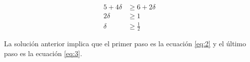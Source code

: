 \documentclass[12pt]{article}
\begin{document}
 
 \begin{minipage}{0.3\linewidth}
 \begin{align}
    5+4\delta&\geq 6+2\delta \label{eq:2}\\
    2\delta&\geq 1\nonumber\\
    \delta&\geq \frac{1}{2} \label{eq:3}
\end{align}
 \end{minipage}
 \begin{minipage}{0.2\linewidth}
\hfill
 \end{minipage}
 \begin{minipage}{0.5\linewidth}
 La solución anterior implica que el primer paso es la ecuación \ref{eq:2} y el último paso es la ecuación \ref{eq:3}.
 \end{minipage}
 
 
 \listoftables
 
\end{document}
